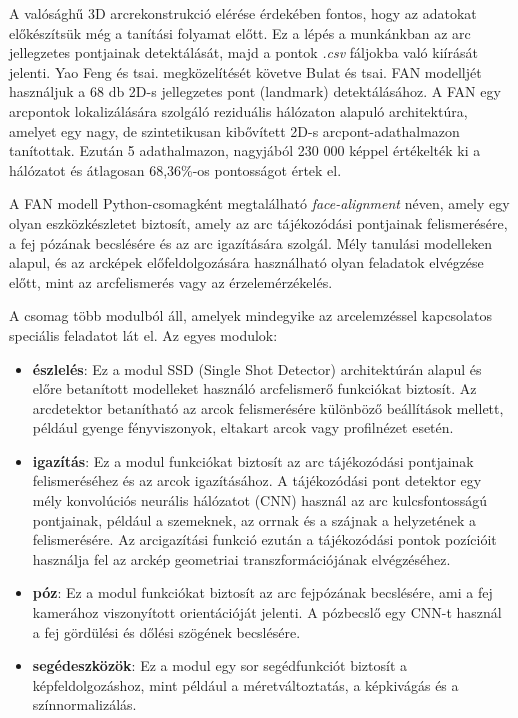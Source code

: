 \documentclass[12pt,a4]{article}
\begin{document}
            A valósághű 3D arcrekonstrukció elérése érdekében fontos, hogy az adatokat előkészítsük még a tanítási folyamat előtt. Ez a lépés a munkánkban az arc jellegzetes pontjainak detektálását, majd a pontok \textit{.csv} fáljokba való kiírását jelenti. Yao Feng és tsai. \cite{deca} megközelítését követve Bulat és tsai. \cite{bulat} FAN modelljét használjuk a 68 db 2D-s jellegzetes pont (landmark) detektálásához. A FAN egy arcpontok lokalizálására szolgáló reziduális hálózaton alapuló architektúra, amelyet  egy nagy, de szintetikusan kibővített 2D-s arcpont-adathalmazon tanítottak. Ezután 5 adathalmazon, nagyjából 230 000 képpel értékelték ki a hálózatot és átlagosan 68,36\%-os pontosságot értek el.

            A FAN modell Python-csomagként megtalálható \textit{face-alignment} néven, amely egy olyan eszközkészletet biztosít, amely az arc tájékozódási pontjainak felismerésére, a fej pózának becslésére és az arc igazítására szolgál. 
            Mély tanulási modelleken alapul, és az arcképek előfeldolgozására használható olyan feladatok elvégzése előtt, mint az arcfelismerés vagy az érzelemérzékelés.
            
            A csomag több modulból áll, amelyek mindegyike az arcelemzéssel kapcsolatos speciális feladatot lát el. Az egyes modulok:

            \begin{itemize}
                \item \textbf{észlelés}:  Ez a modul SSD (Single Shot Detector) architektúrán alapul és előre betanított modelleket használó arcfelismerő funkciókat biztosít. Az arcdetektor betanítható az arcok felismerésére különböző beállítások mellett, például gyenge fényviszonyok, eltakart arcok vagy profilnézet esetén.
        
                \item \textbf{igazítás}: Ez a modul funkciókat biztosít az arc tájékozódási pontjainak felismeréséhez és az arcok igazításához.
        		A tájékozódási pont detektor egy mély konvolúciós neurális hálózatot (CNN) használ az arc kulcsfontosságú pontjainak, például a szemeknek, az orrnak és a szájnak a helyzetének a felismerésére. 
        		Az arcigazítási funkció ezután a tájékozódási pontok pozícióit használja fel az arckép geometriai transzformációjának elvégzéséhez.
        
                \newpage
                \item \textbf{póz}: Ez a modul funkciókat biztosít az arc fejpózának becslésére, ami a fej kamerához viszonyított orientációját jelenti. A pózbecslő egy CNN-t használ a fej gördülési és dőlési szögének becslésére.
                
                \item \textbf{segédeszközök}: Ez a modul egy sor segédfunkciót biztosít a képfeldolgozáshoz, mint például a méretváltoztatás, a képkivágás és a színnormalizálás.
        
            \end{itemize}
\end{document}
